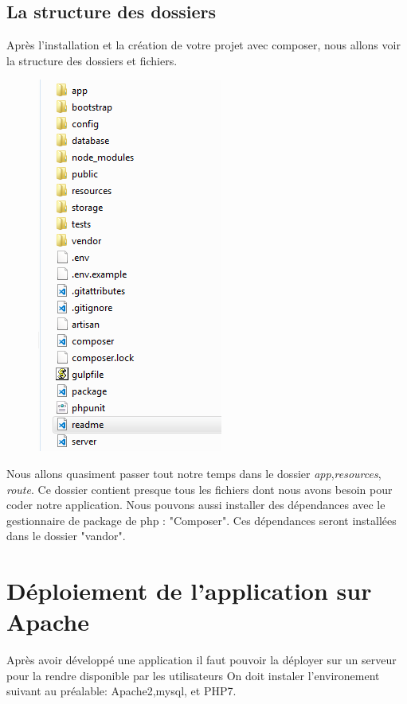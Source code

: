 \subsection{La structure des dossiers}
Après l'installation et la création de votre projet avec composer, nous allons voir la structure des dossiers et fichiers.
\
\begin{figure}[h]
	  	  \includegraphics[scale=0.8]{Chapitre3/images/architecture}
	  
\end{figure}

Nous allons quasiment passer tout notre temps dans le dossier \emph{app},\emph{resources}, \emph{route}. Ce dossier contient presque tous les fichiers dont nous avons besoin pour coder notre application. Nous pouvons aussi installer des dépendances avec le gestionnaire de package de php : "Composer". Ces dépendances seront installées dans le dossier "vandor".











\section{Déploiement de l'application sur Apache}
Après avoir développé une application il faut pouvoir la déployer sur un serveur pour la rendre disponible par les utilisateurs On doit instaler l'environement suivant au préalable: Apache2,mysql, et PHP7.
